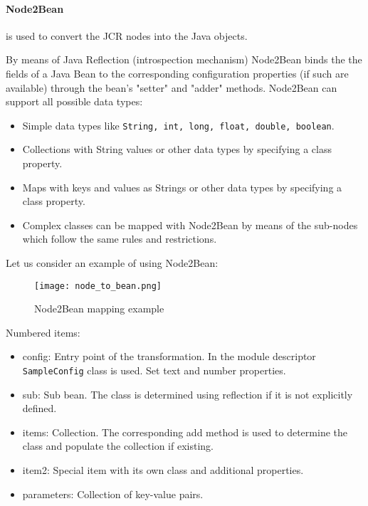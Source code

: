 \paragraph{Node2Bean} is used to convert the JCR nodes into the Java objects. 

By means of Java Reflection (introspection mechanism) Node2Bean binds the the
fields of a Java Bean to the corresponding configuration properties (if such are
available) through the bean's "setter" and "adder" methods. Node2Bean can
support all possible data types:
\begin{itemize}
  \item Simple data types like \texttt{String, int, long, float, double, boolean}.
  \item Collections with String values or other data types by specifying a class property.
  \item Maps with keys and values as Strings or other data types by specifying a class property.
  \item Complex classes can be mapped with Node2Bean by means of the sub-nodes
  which follow the same rules and restrictions.
\end{itemize}

Let us consider an example of using Node2Bean:

\begin{figure}[H]
	\centering
	\texttt{[image: node\_to\_bean.png]}
	\caption{Node2Bean mapping example}
	\label{fig:node2bean}
\end{figure}

Numbered items:

\begin{itemize}
  \item config: Entry point of the transformation. In the module descriptor
  \texttt{SampleConfig} class is used. Set text and number properties.
  \item sub: Sub bean. The class is determined using reflection if it is not
  explicitly defined.
  \item items: Collection. The corresponding add method is used to determine the
  class and populate the collection if existing.
  \item item2: Special item with its own class and additional properties.
  \item parameters: Collection of key-value pairs.
\end{itemize}
